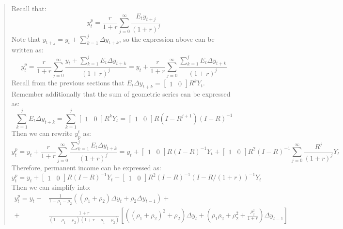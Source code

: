 \begin{exercise}
\begin{enumerate}
\begin{quote}
 Recall that:
 \begin{equation*}
 y_t^p = \frac{r}{1+r}\sum_{j=0}^{\infty} \frac{E_ty_{t+j}}{(1+r)^j}
 \end{equation*}
Note that $y_{t+j} = y_t + \sum_{k=1}^{j} \Delta y_{t+k}$, so the expression above can be written as:
\begin{equation*}
y_t^p =  \frac{r}{1+r}\sum_{j=0}^{\infty} \frac{y_t + \sum_{k=1}^{j} E_t \Delta y_{t+k}}{(1+r)^j} = y_t +\frac{r}{1+r}\sum_{j=0}^{\infty} \frac{\sum_{k=1}^{j} E_t \Delta y_{t+k}}{(1+r)^j}
\end{equation*}
Recall from the previous sections that $E_t \Delta y_{t+k} = \begin{bmatrix}1&0\end{bmatrix}R^k Y_t$.
\\ Remember additionally that the sum of geometric series can be expressed as:
\begin{equation*}
\sum_{k=1}^{j} E_t \Delta y_{t+k} = \sum_{k=1}^{j}  \begin{bmatrix}1&0\end{bmatrix}R^k Y_t =  \begin{bmatrix}1&0\end{bmatrix}R (I-R^{j+1})(I-R)^{-1}
\end{equation*}
Then we can rewrite $y_{p}^t$ as:
\begin{equation*}
y_t^p = y_t + \frac{r}{1+r}\sum_{j=0}^{\infty} \frac{\sum_{k=1}^{j} E_t \Delta y_{t+k}}{(1+r)^j} = y_t + \begin{bmatrix}1&0\end{bmatrix}R (I-R)^{-1}Y_t + \begin{bmatrix}1&0\end{bmatrix}R^2(I-R)^{-1} \sum_{j=0}^{\infty}\frac{ R^{j}}{(1+r)^j}Y_t
\end{equation*}
Therefore, permanent income can be expressed as:
\begin{equation*}
y_t^p = y_t + \begin{bmatrix}1&0\end{bmatrix}R (I-R)^{-1}Y_t + \begin{bmatrix}1&0\end{bmatrix}R^2(I-R)^{-1} (I - R/(1+r))^{-1}Y_t
\end{equation*}
Then we can simplify into:
\begin{align*}
y_t^p = y_t + &\frac{1}{1-\rho_1-\rho_2} ((\rho_1+\rho_2)\Delta y_t + \rho_2 \Delta y_{t-1}) +
\\ + & \frac{1+r}{(1-\rho_1-\rho_2)(1+r-\rho_1-\rho_2)}\left[((\rho_1+\rho_2)^2+\rho_2)\Delta y_t + \left(\rho_1\rho_2 + \rho_2^2+\frac{\rho_2^2}{1+r}\right)\Delta y_{t-1} \right]
\end{align*}


\end{quote}
\end{enumerate}
\end{exercise}
